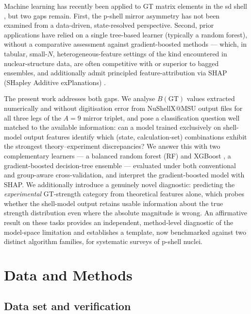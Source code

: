 \documentclass[10pt,twocolumn]{article}
\begin{document}
Machine learning has recently been applied to GT matrix elements in the sd shell \cite{ref8}, but two gaps remain. First, the p-shell mirror asymmetry has not been examined from a data-driven, state-resolved perspective. Second, prior applications have relied on a single tree-based learner (typically a random forest), without a comparative assessment against gradient-boosted methods --- which, in tabular, small-$N$, heterogeneous-feature settings of the kind encountered in nuclear-structure data, are often competitive with or superior to bagged ensembles, and additionally admit principled feature-attribution via SHAP (SHapley Additive exPlanations) \cite{ref_shap}.

The present work addresses both gaps. We analyse $B(\mathrm{GT})$ values extracted numerically and without digitisation error from NuShellX@MSU \cite{ref9} output files for all three legs of the $A=9$ mirror triplet, and pose a classification question well matched to the available information: can a model trained exclusively on shell-model output features identify which (state, calculation-set) combinations exhibit the strongest theory--experiment discrepancies? We answer this with two complementary learners --- a balanced random forest (RF) and XGBoost \cite{ref_xgboost}, a gradient-boosted decision-tree ensemble --- evaluated under both conventional and group-aware cross-validation, and interpret the gradient-boosted model with SHAP. We additionally introduce a genuinely novel diagnostic: predicting the \emph{experimental} GT-strength category from theoretical features alone, which probes whether the shell-model output retains usable information about the true strength distribution even where the absolute magnitude is wrong. An affirmative result on these tasks provides an independent, method-level diagnostic of the model-space limitation and establishes a template, now benchmarked against two distinct algorithm families, for systematic surveys of p-shell nuclei.

\section{Data and Methods}
\label{sec:methods}

\subsection{Data set and verification}
\label{sec:data}
\end{document}
